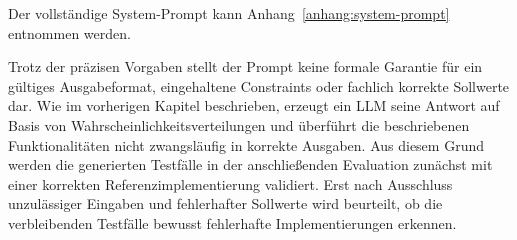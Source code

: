 Der vollständige System-Prompt kann Anhang~\ref{anhang:system-prompt} entnommen werden.

Trotz der präzisen Vorgaben stellt der Prompt keine formale Garantie für ein 
gültiges Ausgabeformat, eingehaltene Constraints oder fachlich korrekte Sollwerte dar.
Wie im vorherigen Kapitel beschrieben, erzeugt ein \ac{LLM} seine Antwort auf Basis 
von Wahrscheinlichkeitsverteilungen und überführt die
beschriebenen Funktionalitäten nicht zwangsläufig in korrekte Ausgaben. 
Aus diesem Grund werden die generierten Testfälle in der anschließenden Evaluation zunächst mit einer
korrekten Referenzimplementierung validiert. Erst nach Ausschluss
unzulässiger Eingaben und fehlerhafter Sollwerte wird beurteilt, ob die
verbleibenden Testfälle bewusst fehlerhafte Implementierungen erkennen.

\newpage